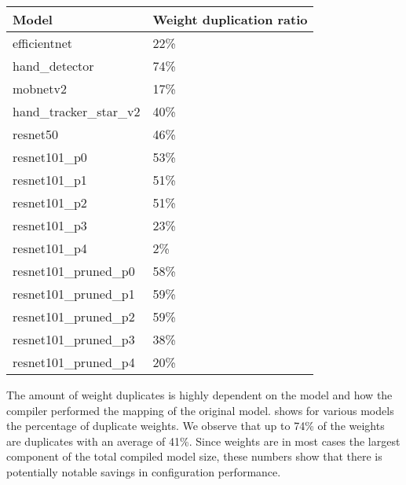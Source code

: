 \begin{table}[hbtp]
\centering
\begin{tabular}{@{}ll@{}}
\toprule
\textbf{Model}          & \textbf{Weight duplication ratio} \\ \midrule
efficientnet            & 22\%                              \\
hand\_detector          & 74\%                              \\
mobnetv2                & 17\%                              \\
hand\_tracker\_star\_v2 & 40\%                              \\
resnet50                & 46\%                              \\
resnet101\_p0           & 53\%                              \\
resnet101\_p1           & 51\%                              \\
resnet101\_p2           & 51\%                              \\
resnet101\_p3           & 23\%                              \\
resnet101\_p4           & 2\%                               \\
resnet101\_pruned\_p0   & 58\%                              \\
resnet101\_pruned\_p1   & 59\%                              \\
resnet101\_pruned\_p2   & 59\%                              \\
resnet101\_pruned\_p3   & 38\%                              \\
resnet101\_pruned\_p4   & 20\%                              \\ \bottomrule
\end{tabular}
\caption{}
\label{tab:my-table}
\end{table}

The amount of weight duplicates is highly dependent on the model and how the compiler performed the mapping of the original model.
 shows for various models the percentage of duplicate weights.
We observe that up to 74\% of the weights are duplicates with an average of 41\%.
Since weights are in most cases the largest component of the total compiled model size, these numbers show that there is potentially notable savings in configuration performance.